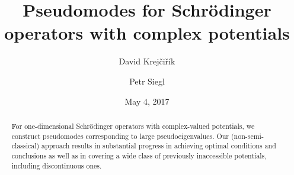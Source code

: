 
\usepackage{amssymb,amsmath,amsthm}
\usepackage{stackrel}
\usepackage{url}
\usepackage{color}
\usepackage[shortlabels]{enumitem}
\usepackage{mathtools}

\newtheorem{Theorem}{Theorem}[section]
\newtheorem{Lemma}[Theorem]{Lemma}
\newtheorem{Proposition}[Theorem]{Proposition}
\newtheorem{Corollary}[Theorem]{Corollary}
\newtheorem{Conjecture}{Conjecture}
\theoremstyle{definition}
\newtheorem{Remark}[Theorem]{Remark}
\newtheorem{Remarks}{Remarks}
\newtheorem{Assumption}{Assumption}

\newtheorem{Example}[Theorem]{Example}

\usepackage[normalem]{ulem}

\author{David Krej\v ci\v r\'ik}
\address[David Krej\v ci\v r\'ik]{Department of Mathematics, Faculty of Nuclear Sciences and Physical Engineering, Czech Technical University in Prague, Trojanova 13, 12000 Prague~2, Czech Republic}
	
\author{Petr Siegl}
\address[Petr Siegl]{
Mathematical Institute, 
University of Bern,
Alpeneggstr.~22,
3012 Bern, Switzerland
\& On leave from Nuclear Physics Institute CAS, 25068 \v Re\v z, Czech Republic}


\title{Pseudomodes for Schr\"odinger operators with complex potentials}

\date{May 4, 2017}



\begin{abstract}
For one-dimensional Schr\"odinger operators with complex-valued potentials, 
we construct pseudomodes corresponding to large pseudoeigenvalues.
Our (non-semi-classical) approach results in substantial progress 
in achieving optimal conditions and conclusions as well as in covering a wide class
of previously inaccessible potentials, including discontinuous ones.
\end{abstract}

\maketitle

